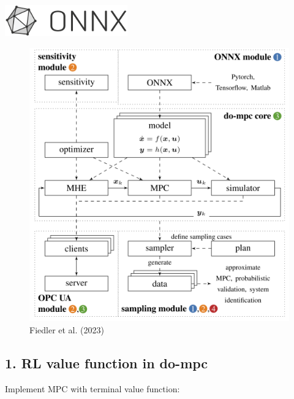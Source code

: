 \documentclass[
  letterpaper,
  DIV=11,
  numbers=noendperiod,
  oneside]{scrartcl}
\begin{document}
\includegraphics[width=2.08333in,height=\textheight]{figs/onnx.png}

\begin{figure}[H]

{\centering \includegraphics{figs/do_mpc_elements.png}

}

\caption{Fiedler et al. (2023)}

\end{figure}%

\subsection{1. RL value function in
do-mpc}\label{rl-value-function-in-do-mpc-2}

Implement MPC with terminal value function:
\end{document}
